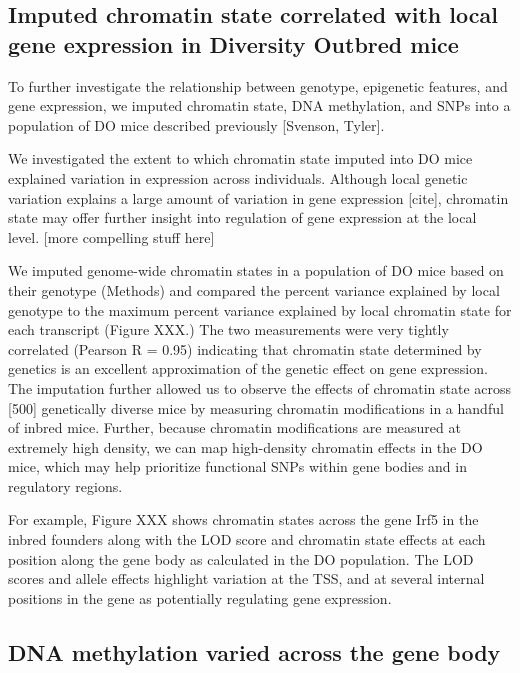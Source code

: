 \documentclass[10pt,letterpaper]{article}
\begin{document}
\hypertarget{imputed-chromatin-state-correlated-with-local-gene-expression-in-diversity-outbred-mice}{%
\subsection{Imputed chromatin state correlated with local gene
expression in Diversity Outbred
mice}\label{imputed-chromatin-state-correlated-with-local-gene-expression-in-diversity-outbred-mice}}

To further investigate the relationship between genotype, epigenetic
features, and gene expression, we imputed chromatin state, DNA
methylation, and SNPs into a population of DO mice described previously
{[}Svenson, Tyler{]}.

We investigated the extent to which chromatin state imputed into DO mice
explained variation in expression across individuals. Although local
genetic variation explains a large amount of variation in gene
expression {[}cite{]}, chromatin state may offer further insight into
regulation of gene expression at the local level. {[}more compelling
stuff here{]}

We imputed genome-wide chromatin states in a population of DO mice based
on their genotype (Methods) and compared the percent variance explained
by local genotype to the maximum percent variance explained by local
chromatin state for each transcript (Figure XXX.) The two measurements
were very tightly correlated (Pearson R = 0.95) indicating that
chromatin state determined by genetics is an excellent approximation of
the genetic effect on gene expression. The imputation further allowed us
to observe the effects of chromatin state across {[}500{]} genetically
diverse mice by measuring chromatin modifications in a handful of inbred
mice. Further, because chromatin modifications are measured at extremely
high density, we can map high-density chromatin effects in the DO mice,
which may help prioritize functional SNPs within gene bodies and in
regulatory regions.

For example, Figure XXX shows chromatin states across the gene Irf5 in
the inbred founders along with the LOD score and chromatin state effects
at each position along the gene body as calculated in the DO population.
The LOD scores and allele effects highlight variation at the TSS, and at
several internal positions in the gene as potentially regulating gene
expression.

\hypertarget{dna-methylation-varied-across-the-gene-body}{%
\subsection{DNA methylation varied across the gene
body}\label{dna-methylation-varied-across-the-gene-body}}
\end{document}
